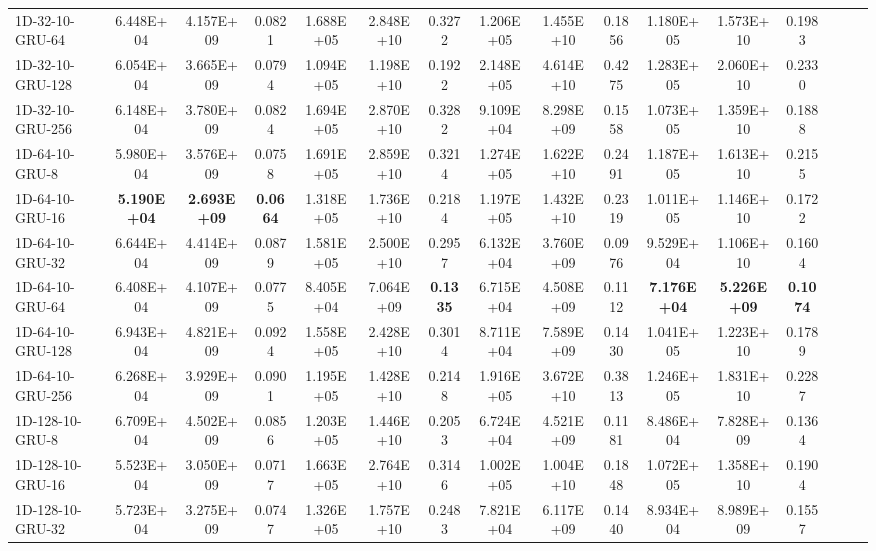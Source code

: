 \begin{landscape}
\begin{longtable}{|l|c|c|c|c|c|c|c|c|c|c|c|c|c|c|c|}
    1D-32-10-GRU-64 & 6.448E+04 & 4.157E+09 & 0.0821 & 1.688E+05 & 2.848E+10 & 0.3272 & 1.206E+05 & 1.455E+10 & 0.1856 & 1.180E+05 & 1.573E+10 & 0.1983 \\
    1D-32-10-GRU-128 & 6.054E+04 & 3.665E+09 & 0.0794 & 1.094E+05 & 1.198E+10 & 0.1922 & 2.148E+05 & 4.614E+10 & 0.4275 & 1.283E+05 & 2.060E+10 & 0.2330 \\
    1D-32-10-GRU-256 & 6.148E+04 & 3.780E+09 & 0.0824 & 1.694E+05 & 2.870E+10 & 0.3282 & 9.109E+04 & 8.298E+09 & 0.1558 & 1.073E+05 & 1.359E+10 & 0.1888 \\
    1D-64-10-GRU-8 & 5.980E+04 & 3.576E+09 & 0.0758 & 1.691E+05 & 2.859E+10 & 0.3214 & 1.274E+05 & 1.622E+10 & 0.2491 & 1.187E+05 & 1.613E+10 & 0.2155 \\
    1D-64-10-GRU-16 & \cellcolor[rgb]{ .573,  .816,  .314}\textbf{5.190E+04} & \cellcolor[rgb]{ .573,  .816,  .314}\textbf{2.693E+09} & \cellcolor[rgb]{ .573,  .816,  .314}\textbf{0.0664} & 1.318E+05 & 1.736E+10 & 0.2184 & 1.197E+05 & 1.432E+10 & 0.2319 & 1.011E+05 & 1.146E+10 & 0.1722 \\
    1D-64-10-GRU-32 & 6.644E+04 & 4.414E+09 & 0.0879 & 1.581E+05 & 2.500E+10 & 0.2957 & 6.132E+04 & 3.760E+09 & 0.0976 & 9.529E+04 & 1.106E+10 & 0.1604 \\
    1D-64-10-GRU-64 & 6.408E+04 & 4.107E+09 & 0.0775 & 8.405E+04 & 7.064E+09 & \cellcolor[rgb]{ .573,  .816,  .314}\textbf{0.1335} & 6.715E+04 & 4.508E+09 & 0.1112 & \cellcolor[rgb]{ .573,  .816,  .314}\textbf{7.176E+04} & \cellcolor[rgb]{ .573,  .816,  .314}\textbf{5.226E+09} & \cellcolor[rgb]{ .573,  .816,  .314}\textbf{0.1074} \\
    1D-64-10-GRU-128 & 6.943E+04 & 4.821E+09 & 0.0924 & 1.558E+05 & 2.428E+10 & 0.3014 & 8.711E+04 & 7.589E+09 & 0.1430 & 1.041E+05 & 1.223E+10 & 0.1789 \\
    1D-64-10-GRU-256 & 6.268E+04 & 3.929E+09 & 0.0901 & 1.195E+05 & 1.428E+10 & 0.2148 & 1.916E+05 & 3.672E+10 & 0.3813 & 1.246E+05 & 1.831E+10 & 0.2287 \\
    1D-128-10-GRU-8 & 6.709E+04 & 4.502E+09 & 0.0856 & 1.203E+05 & 1.446E+10 & 0.2053 & 6.724E+04 & 4.521E+09 & 0.1181 & 8.486E+04 & 7.828E+09 & 0.1364 \\
    1D-128-10-GRU-16 & 5.523E+04 & 3.050E+09 & 0.0717 & 1.663E+05 & 2.764E+10 & 0.3146 & 1.002E+05 & 1.004E+10 & 0.1848 & 1.072E+05 & 1.358E+10 & 0.1904 \\
    1D-128-10-GRU-32 & 5.723E+04 & 3.275E+09 & 0.0747 & 1.326E+05 & 1.757E+10 & 0.2483 & 7.821E+04 & 6.117E+09 & 0.1440 & 8.934E+04 & 8.989E+09 & 0.1557 \\

\end{longtable}
\end{landscape}

